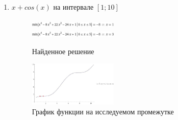 \documentclass[12pt]{article}
\begin{document}
\begin{enumerate}
\newpage
\item $x+cos(x)$ на интервале $[1; 10]$

\begin{figure}[h]
\centering
\includegraphics[width=0.4\textwidth]{images/1loc1.jpg} \\
\includegraphics[width=0.4\textwidth]{images/1loc2.jpg}
\caption{Найденное решение}
\end{figure}

\begin{figure}[h]
\centering
\includegraphics[width=0.4\textwidth]{images/2loc3.jpg}
\caption{График функции на исследуемом промежутке}
\end{figure}


\end{enumerate}
\end{document}
